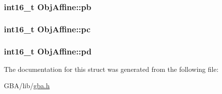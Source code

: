 \hypertarget{struct_obj_affine_a1f9024df291f5a7c32ce2444c8446144}{
\subsubsection[{pb}]{\setlength{\rightskip}{0pt plus 5cm}int16\-\_\-t {\bf Obj\-Affine\-::pb}}}\label{struct_obj_affine_a1f9024df291f5a7c32ce2444c8446144}
\hypertarget{struct_obj_affine_a2fd9f343a9c4a1dd3911f94db706e7ff}{
\subsubsection[{pc}]{\setlength{\rightskip}{0pt plus 5cm}int16\-\_\-t {\bf Obj\-Affine\-::pc}}}\label{struct_obj_affine_a2fd9f343a9c4a1dd3911f94db706e7ff}
\hypertarget{struct_obj_affine_a1ae4cd5cf780b89479e4fe39d2377798}{
\subsubsection[{pd}]{\setlength{\rightskip}{0pt plus 5cm}int16\-\_\-t {\bf Obj\-Affine\-::pd}}}\label{struct_obj_affine_a1ae4cd5cf780b89479e4fe39d2377798}


The documentation for this struct was generated from the following file\-:\begin{DoxyCompactItemize}
\item 
G\-B\-A/lib/\hyperlink{gba_8h}{gba.\-h}\end{DoxyCompactItemize}
